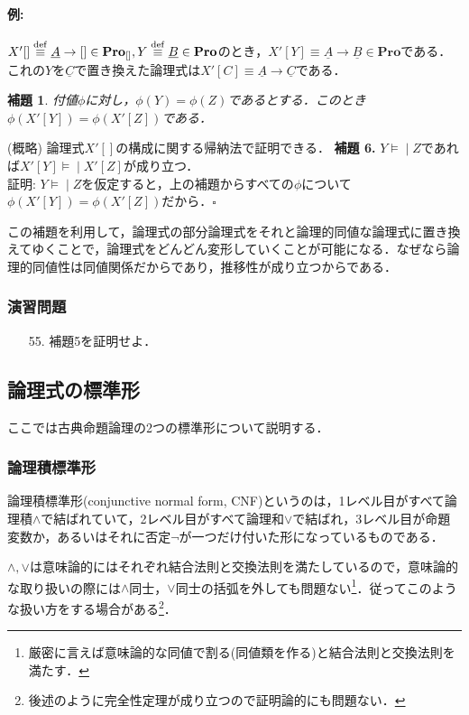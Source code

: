 \documentclass{ltjsarticle}
\makeatletter
\theoremstyle{mystyle1}
\newtheorem{lem}[dfn]{補題}
\theoremstyle{mystyle2}
\renewenvironment{proof}[1][\proofname]{\par
  \pushQED{\qed}%
  \normalfont
  \topsep6\p@\@plus6\p@ \trivlist
  \item[\hskip\labelsep{\bfseries\sffamily #1}]\ignorespaces
}{%
  \popQED\endtrivlist\@endpefalse
}
\renewcommand\proofname{\ensuremath{\because}}
\newcommand{\uA}{\underline{A}}
\newcommand{\uB}{\underline{B}}
\newcommand{\uC}{\underline{C}}
\newcommand{\bPro}{\ensuremath{\mathbf{Pro}}}
\newcommand{\dequiv}{\ensuremath{\stackrel{\rm{def}}{\equiv}}}
\newcommand{\lequiv}{\ensuremath{\models\!\mid}}
\newcommand{\red}[1]{{\color{red} #1}}
\makeatother
\begin{document}
\paragraph{例:}
$X'[]\dequiv\uA\to[]\in\bPro_{[]},Y \dequiv\uB\in\bPro$のとき，$X'[Y] \equiv \uA \to \uB\in\bPro$である．これの$Y$を$\uC$で置き換えた論理式は$X'[C] \equiv\uA\to\uC$である．

\begin{lem}
  付値$\phi$に対し，$\phi(Y) = \phi(Z)$であるとする．このとき$\phi(X'[Y]) = \phi(X'[Z])$である．
\end{lem}
\begin{proof}
  (概略) 論理式$X'[]$の構成に関する帰納法で証明できる．
\end{proof}
\textbf{補題 6.} $Y\lequiv Z$であれば$X'[Y] \lequiv X'[Z]$が成り立つ．\\
証明: $Y\lequiv Z$を仮定すると，上の補題からすべての$\phi$について$\phi(X'[Y]) = \phi(X'[Z])$だから．$\square$

この補題を利用して，論理式の部分論理式をそれと論理的同値な論理式に置き換えてゆくことで，論理式をどんどん変形していくことが可能になる．なぜなら論理的同値性は同値関係だからであり，推移性が成り立つからである．
\subsubsection*{演習問題}
\begin{enumerate}
  \item[55.] 補題5を証明せよ．
\end{enumerate}
\subsection{論理式の標準形}
ここでは古典命題論理の2つの標準形について説明する．
\subsubsection{論理積標準形}\label{CNF}
\red{論理積標準形}(conjunctive normal form, CNF)というのは，1レベル目がすべて論理積$\wedge$で結ばれていて，2レベル目がすべて論理和$\vee$で結ばれ，3レベル目が命題変数か，あるいはそれに否定$\neg$が一つだけ付いた形になっているものである．

$\wedge, \vee$は意味論的にはそれぞれ結合法則と交換法則を満たしているので，意味論的な取り扱いの際には$\wedge$同士，$\vee$同士の括弧を外しても問題ない\footnote{厳密に言えば意味論的な同値で割る(同値類を作る)と結合法則と交換法則を満たす．}．従ってこのような扱い方をする場合がある\footnote{後述のように完全性定理が成り立つので証明論的にも問題ない．}．
\end{document}
